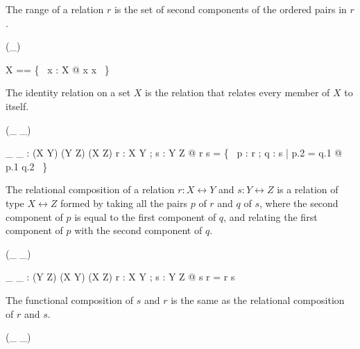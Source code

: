 \documentclass[draft,a4paper,10pt,wd]{isov2}
\begin{document}
The range of a relation $r$ is the set of second components of the ordered
pairs in $r$.


\begin{zed}
\generic (\id \_)
\end{zed}

\begin{zed}
\id X == \{~ x : X @ x \mapsto x ~\}
\end{zed}

The identity relation on a set $X$ is the relation that relates every
member of $X$ to itself.


\begin{zed}
 \leftassoc (\_ \comp \_)
\end{zed}

\begin{gendef}[X,Y,Z]
\_ \comp \_ : (X \rel Y) \cross (Y \rel Z) \fun (X \rel Z)
\where
\forall r : X \rel Y ; s : Y \rel Z @
 r \comp s = \{~ p : r ; q : s | p.2 = q.1 @ p.1 \mapsto q.2 ~\}
\end{gendef}

The relational composition of a relation $r : X \rel Y$ and $s : Y \rel Z$
is a relation of type $X \rel Z$ formed by taking
all the pairs $p$ of $r$ and $q$ of $s$,
where the second component of $p$ is equal to the first component of $q$,
and relating the first component of $p$ with the second component of $q$.


\begin{zed}
 \leftassoc (\_ \circ \_)
\end{zed}

\begin{gendef}[X,Y,Z]
\_ \circ \_ : (Y \rel Z) \cross (X \rel Y) \fun (X \rel Z)
\where
\forall r : X \rel Y ; s : Y \rel Z @ s \circ r = r \comp s
\end{gendef}

The functional composition of $s$ and $r$ is the same as
the relational composition of $r$ and $s$.


\begin{zed}
 \rightassoc (\_ \dres \_)
\end{zed}
\end{document}
